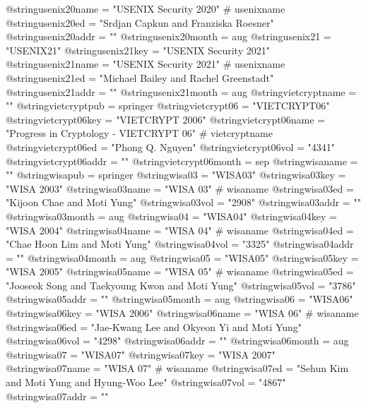 @string{usenix20name =          "USENIX Security 2020" # usenixname}
@string{usenix20ed =            "Srdjan Capkun and Franziska Roesner"}
@string{usenix20addr =          ""}
@string{usenix20month =         aug}
@string{usenix21 =              "USENIX21"}
@string{usenix21key =           "USENIX Security 2021"}
@string{usenix21name =          "USENIX Security 2021" # usenixname}
@string{usenix21ed =            "Michael Bailey and Rachel Greenstadt"}
@string{usenix21addr =          ""}
@string{usenix21month =         aug}
@string{vietcryptname =         ""}
@string{vietcryptpub =          springer}
@string{vietcrypt06 =           "VIETCRYPT06"}
@string{vietcrypt06key =        "VIETCRYPT 2006"}
@string{vietcrypt06name =       "Progress in Cryptology - VIETCRYPT 06" # vietcryptname}
@string{vietcrypt06ed =         "Phong Q. Nguyen"}
@string{vietcrypt06vol =        "4341"}
@string{vietcrypt06addr =       ""}
@string{vietcrypt06month =      sep}
@string{wisaname =              ""}
@string{wisapub =               springer}
@string{wisa03 =                "WISA03"}
@string{wisa03key =             "WISA 2003"}
@string{wisa03name =            "WISA 03" # wisaname}
@string{wisa03ed =              "Kijoon Chae and Moti Yung"}
@string{wisa03vol =             "2908"}
@string{wisa03addr =            ""}
@string{wisa03month =           aug}
@string{wisa04 =                "WISA04"}
@string{wisa04key =             "WISA 2004"}
@string{wisa04name =            "WISA 04" # wisaname}
@string{wisa04ed =              "Chae Hoon Lim and Moti Yung"}
@string{wisa04vol =             "3325"}
@string{wisa04addr =            ""}
@string{wisa04month =           aug}
@string{wisa05 =                "WISA05"}
@string{wisa05key =             "WISA 2005"}
@string{wisa05name =            "WISA 05" # wisaname}
@string{wisa05ed =              "Jooseok Song and Taekyoung Kwon and Moti Yung"}
@string{wisa05vol =             "3786"}
@string{wisa05addr =            ""}
@string{wisa05month =           aug}
@string{wisa06 =                "WISA06"}
@string{wisa06key =             "WISA 2006"}
@string{wisa06name =            "WISA 06" # wisaname}
@string{wisa06ed =              "Jae-Kwang Lee and Okyeon Yi and Moti Yung"}
@string{wisa06vol =             "4298"}
@string{wisa06addr =            ""}
@string{wisa06month =           aug}
@string{wisa07 =                "WISA07"}
@string{wisa07key =             "WISA 2007"}
@string{wisa07name =            "WISA 07" # wisaname}
@string{wisa07ed =              "Sehun Kim and Moti Yung and Hyung-Woo Lee"}
@string{wisa07vol =             "4867"}
@string{wisa07addr =            ""}
